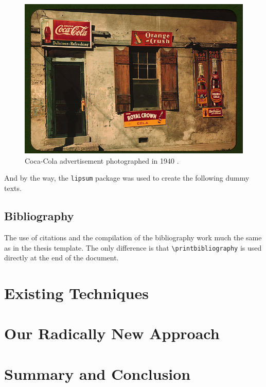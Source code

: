 \documentclass[english,twocolumn,smartquotes]{hgbarticle}
\begin{document}
\begin{figure}
	\centering
	\includegraphics[width=1.0\columnwidth]{cola-public-domain-photo-p}
	\caption{Coca-Cola advertisement photographed in 1940 \cite{CocaCola1940}.}
	\label{fig:CocaCola}
\end{figure}

And by the way, the \texttt{lipsum} package was used to create the following
dummy texts. 

\subsection{Bibliography}

The use of citations and the compilation of the bibliography work much the
same as in the thesis template. The only difference is that
\verb!\printbibliography! is used directly at the end of the document.


\section{Existing Techniques}

\lipsum[2-4]


\section{Our Radically New Approach}

\lipsum[5-7]


\section{Summary and Conclusion}

\lipsum[8-9]

\printbibliography %

\end{document}
